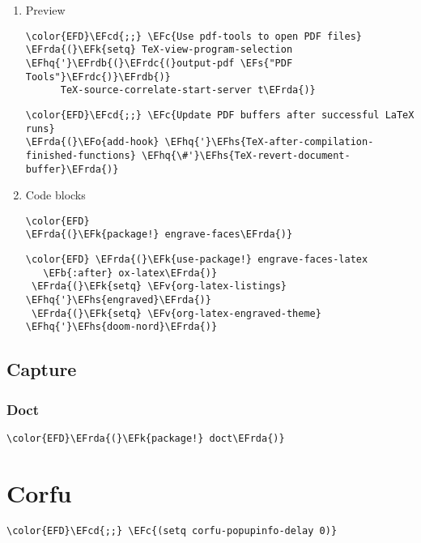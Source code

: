 \documentclass[12pt]{article}
\theoremstyle{plain}%
\theoremstyle{definition}
\theoremstyle{remark}
\newcommand{\EFc}[1]{\textcolor{EFc}{#1}} %
\newcommand{\EFcd}[1]{\textcolor{EFcd}{#1}} %
\newcommand{\EFs}[1]{\textcolor{EFs}{#1}} %
\newcommand{\EFk}[1]{\textcolor{EFk}{#1}} %
\newcommand{\EFb}[1]{\textcolor{EFb}{#1}} %
\newcommand{\EFv}[1]{\textcolor{EFv}{#1}} %
\newcommand{\EFo}[1]{\textcolor{EFo}{#1}} %
\newcommand{\EFhq}[1]{\textcolor{EFhq}{#1}} %
\newcommand{\EFhs}[1]{\textcolor{EFhs}{#1}} %
\newcommand{\EFrda}[1]{\textcolor{EFrda}{#1}} %
\newcommand{\EFrdb}[1]{\textcolor{EFrdb}{#1}} %
\newcommand{\EFrdc}[1]{\textcolor{EFrdc}{#1}} %
\begin{document}
\begin{enumerate}
\item Preview
\label{sec:orge997ac9}
\begin{Code}
\begin{Verbatim}
\color{EFD}\EFcd{;;} \EFc{Use pdf-tools to open PDF files}
\EFrda{(}\EFk{setq} TeX-view-program-selection \EFhq{'}\EFrdb{(}\EFrdc{(}output-pdf \EFs{"PDF Tools"}\EFrdc{)}\EFrdb{)}
      TeX-source-correlate-start-server t\EFrda{)}
\end{Verbatim}
\end{Code}
\begin{Code}
\begin{Verbatim}
\color{EFD}\EFcd{;;} \EFc{Update PDF buffers after successful LaTeX runs}
\EFrda{(}\EFo{add-hook} \EFhq{'}\EFhs{TeX-after-compilation-finished-functions} \EFhq{\#'}\EFhs{TeX-revert-document-buffer}\EFrda{)}
\end{Verbatim}
\end{Code}
\item Code blocks
\label{sec:org7c7ecd4}
\begin{Code}
\begin{Verbatim}
\color{EFD}
\EFrda{(}\EFk{package!} engrave-faces\EFrda{)}
\end{Verbatim}
\end{Code}
\begin{Code}
\begin{Verbatim}
\color{EFD} \EFrda{(}\EFk{use-package!} engrave-faces-latex
   \EFb{:after} ox-latex\EFrda{)}
 \EFrda{(}\EFk{setq} \EFv{org-latex-listings} \EFhq{'}\EFhs{engraved}\EFrda{)}
 \EFrda{(}\EFk{setq} \EFv{org-latex-engraved-theme} \EFhq{'}\EFhs{doom-nord}\EFrda{)}
\end{Verbatim}
\end{Code}
\end{enumerate}
\subsection{Capture}
\label{sec:org2dcede6}
\subsubsection{Doct}
\label{sec:orgc215235}
\begin{Code}
\begin{Verbatim}
\color{EFD}\EFrda{(}\EFk{package!} doct\EFrda{)}
\end{Verbatim}
\end{Code}
\section{Corfu}
\label{sec:orgc7a5049}
\begin{Code}
\begin{Verbatim}
\color{EFD}\EFcd{;;} \EFc{(setq corfu-popupinfo-delay 0)}
\end{Verbatim}
\end{Code}
\end{document}
